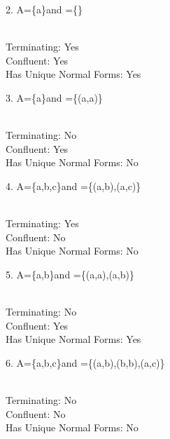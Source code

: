 \documentclass{article}
\theoremstyle{theorem}
\theoremstyle{definition}
\theoremstyle{remark}
\begin{document}
2. \quad A=\{a\}\quad and =\{\}

\\
Terminating: Yes\\
Confluent: Yes\\
Has Unique Normal Forms: Yes

3. \quad A=\{a\}\quad and =\{(a,a)\}

\\
Terminating: No\\
Confluent: Yes\\
Has Unique Normal Forms: No

4. \quad A=\{a,b,c\}\quad and =\{(a,b),(a,c)\}

\\
Terminating: Yes\\
Confluent: No\\
Has Unique Normal Forms: No

5. \quad A=\{a,b\}\quad and =\{(a,a),(a,b)\}

\\
Terminating: No\\
Confluent: Yes\\
Has Unique Normal Forms: Yes

6. \quad A=\{a,b,c\}\quad and =\{(a,b),(b,b),(a,c)\}

\\
Terminating: No\\
Confluent: No\\
Has Unique Normal Forms: No
\end{document}
